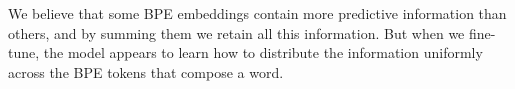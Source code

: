 \documentclass[11pt]{article}
\begin{document}
        We believe that some BPE embeddings contain more predictive
     information than others, and by summing them we retain all this
     information.
         But when we fine-tune, the model appears to learn how to
     distribute the information uniformly across the BPE tokens that
     compose a word.
    
    



\end{document}
